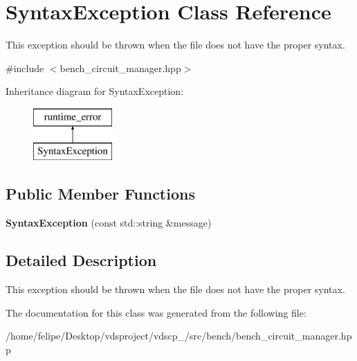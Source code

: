 \section{Syntax\+Exception Class Reference}
\label{classSyntaxException}


This exception should be thrown when the file does not have the proper syntax.  




{\ttfamily \#include $<$bench\+\_\+circuit\+\_\+manager.\+hpp$>$}

Inheritance diagram for Syntax\+Exception\+:\begin{figure}[H]
\begin{center}
\leavevmode
\includegraphics[height=2.000000cm]{classSyntaxException}
\end{center}
\end{figure}
\subsection*{Public Member Functions}
\begin{DoxyCompactItemize}
\item 
{\bfseries Syntax\+Exception} (const std\+::string \&message)\label{classSyntaxException_a017056b4446f0770e521c995c661aa25}

\end{DoxyCompactItemize}


\subsection{Detailed Description}
This exception should be thrown when the file does not have the proper syntax. 

The documentation for this class was generated from the following file\+:\begin{DoxyCompactItemize}
\item 
/home/felipe/\+Desktop/vdsproject/vdscp\+\_/src/bench/bench\+\_\+circuit\+\_\+manager.\+hpp\end{DoxyCompactItemize}
